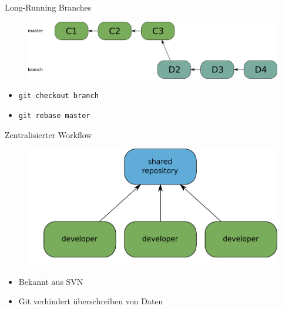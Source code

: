 \begin{frame}{Long-Running Branches}
  \begin{figure} 
  \centering
    \includegraphics[scale=0.4]{images/long-running-branch3.pdf}
  \end{figure}
  \tiny
  \begin{itemize}
    \pause \item \texttt{git checkout branch}
    \pause \item \texttt{git rebase master}
  \end{itemize}
\end{frame}

\begin{frame}{Zentralisierter Workflow}
  \begin{figure} 
  \centering
    \includegraphics[scale=0.6]{images/centralized/centralized-workflow.pdf}
  \end{figure}
  \begin{itemize}
    \pause \item Bekannt aus SVN
    \pause \item Git verhindert überschreiben von Daten
  \end{itemize}
\end{frame}

